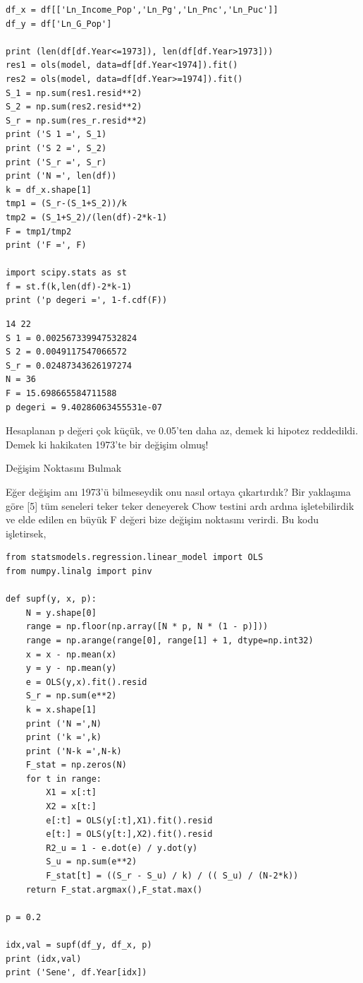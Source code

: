 \documentclass[12pt,fleqn]{article}\usepackage{../../common}
\begin{document}
\begin{verbatim}
df_x = df[['Ln_Income_Pop','Ln_Pg','Ln_Pnc','Ln_Puc']]
df_y = df['Ln_G_Pop']

print (len(df[df.Year<=1973]), len(df[df.Year>1973]))
res1 = ols(model, data=df[df.Year<1974]).fit()
res2 = ols(model, data=df[df.Year>=1974]).fit()
S_1 = np.sum(res1.resid**2)
S_2 = np.sum(res2.resid**2)
S_r = np.sum(res_r.resid**2)
print ('S 1 =', S_1)
print ('S 2 =', S_2)
print ('S_r =', S_r)
print ('N =', len(df))
k = df_x.shape[1]
tmp1 = (S_r-(S_1+S_2))/k
tmp2 = (S_1+S_2)/(len(df)-2*k-1)
F = tmp1/tmp2
print ('F =', F)

import scipy.stats as st
f = st.f(k,len(df)-2*k-1)
print ('p degeri =', 1-f.cdf(F))
\end{verbatim}

\begin{verbatim}
14 22
S 1 = 0.002567339947532824
S 2 = 0.0049117547066572
S_r = 0.02487343626197274
N = 36
F = 15.698665584711588
p degeri = 9.40286063455531e-07
\end{verbatim}

Hesaplanan p değeri çok küçük, ve 0.05'ten daha az, demek ki hipotez
reddedildi. Demek ki hakikaten 1973'te bir değişim olmuş!

Değişim Noktasını Bulmak

Eğer değişim anı 1973'ü bilmeseydik onu nasıl ortaya çıkartırdık? Bir
yaklaşıma göre [5] tüm seneleri teker teker deneyerek Chow testini ardı
ardına işletebilirdik ve elde edilen en büyük F değeri bize değişim
noktasını verirdi. Bu kodu işletirsek,

\begin{verbatim}
from statsmodels.regression.linear_model import OLS
from numpy.linalg import pinv

def supf(y, x, p):
    N = y.shape[0]
    range = np.floor(np.array([N * p, N * (1 - p)]))
    range = np.arange(range[0], range[1] + 1, dtype=np.int32)
    x = x - np.mean(x)
    y = y - np.mean(y)
    e = OLS(y,x).fit().resid
    S_r = np.sum(e**2)
    k = x.shape[1]
    print ('N =',N)
    print ('k =',k)
    print ('N-k =',N-k)
    F_stat = np.zeros(N)
    for t in range:
        X1 = x[:t]
        X2 = x[t:]
        e[:t] = OLS(y[:t],X1).fit().resid
        e[t:] = OLS(y[t:],X2).fit().resid
        R2_u = 1 - e.dot(e) / y.dot(y)
        S_u = np.sum(e**2)
        F_stat[t] = ((S_r - S_u) / k) / (( S_u) / (N-2*k))
    return F_stat.argmax(),F_stat.max()
    
p = 0.2

idx,val = supf(df_y, df_x, p)
print (idx,val)
print ('Sene', df.Year[idx])
\end{verbatim}
\end{document}
